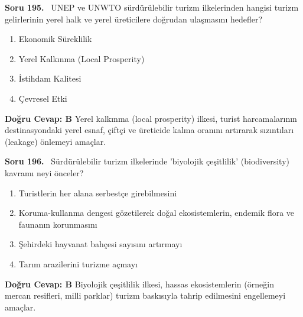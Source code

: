 \documentclass[11pt,a4paper,openany]{book}
\begin{document}
\needspace{5cm}
\vspace{8pt}
\noindent\textbf{\large\sffamily Soru 195.} \ UNEP ve UNWTO sürdürülebilir turizm ilkelerinden hangisi turizm gelirlerinin yerel halk ve yerel üreticilere doğrudan ulaşmasını hedefler?
\begin{enumerate}[label=\Alph*), leftmargin=25pt, topsep=4pt, itemsep=2pt]
    \item Ekonomik Süreklilik
    \item Yerel Kalkınma (Local Prosperity)
    \item İstihdam Kalitesi
    \item Çevresel Etki
\end{enumerate}
\vspace{4pt}
\begin{tcolorbox}[title=Cevap ve Açıklama, colback=gray!3!white, colframe=primarycolor!90!black, arc=2mm, fonttitle=\bfseries\sffamily, top=6pt, bottom=6pt]
    \textbf{Doğru Cevap: B}
    \vspace{2pt}
    Yerel kalkınma (local prosperity) ilkesi, turist harcamalarının destinasyondaki yerel esnaf, çiftçi ve üreticide kalma oranını artırarak sızıntıları (leakage) önlemeyi amaçlar.
\end{tcolorbox}
\vspace{10pt}

\needspace{5cm}
\vspace{8pt}
\noindent\textbf{\large\sffamily Soru 196.} \ Sürdürülebilir turizm ilkelerinde 'biyolojik çeşitlilik' (biodiversity) kavramı neyi önceler?
\begin{enumerate}[label=\Alph*), leftmargin=25pt, topsep=4pt, itemsep=2pt]
    \item Turistlerin her alana serbestçe girebilmesini
    \item Koruma-kullanma dengesi gözetilerek doğal ekosistemlerin, endemik flora ve faunanın korunmasını
    \item Şehirdeki hayvanat bahçesi sayısını artırmayı
    \item Tarım arazilerini turizme açmayı
\end{enumerate}
\vspace{4pt}
\begin{tcolorbox}[title=Cevap ve Açıklama, colback=gray!3!white, colframe=primarycolor!90!black, arc=2mm, fonttitle=\bfseries\sffamily, top=6pt, bottom=6pt]
    \textbf{Doğru Cevap: B}
    \vspace{2pt}
    Biyolojik çeşitlilik ilkesi, hassas ekosistemlerin (örneğin mercan resifleri, milli parklar) turizm baskısıyla tahrip edilmesini engellemeyi amaçlar.
\end{tcolorbox}
\vspace{10pt}
\end{document}
